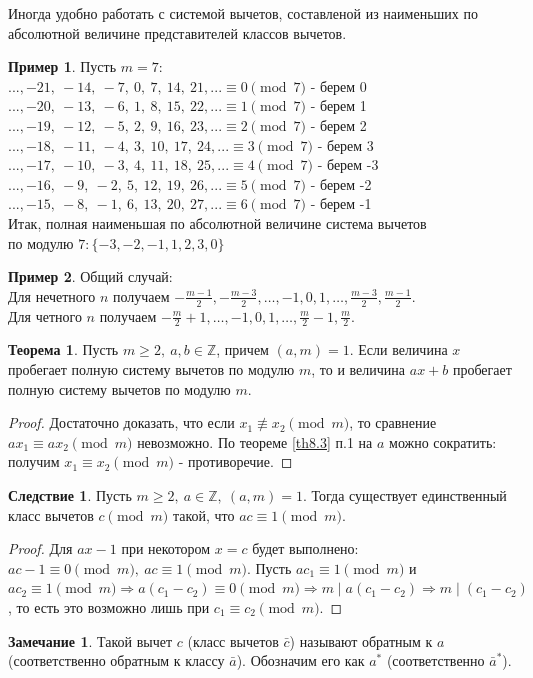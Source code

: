 \documentclass[a4paper, 12pt]{article}
\newcommand{\Z}{\mathbb{Z}}
\renewcommand{\div}{\mid}
\theoremstyle{definition}
\newtheorem{theorem}{Теорема}[section]
\newtheorem*{consequense}{Следствие}
\newtheorem*{comm}{Замечание}
\newtheorem*{example}{Пример}
\begin{document}
    Иногда удобно работать с системой вычетов, составленой из наименьших по абсолютной величине представителей классов вычетов.
    \begin{example}
        Пусть $m=7$:\\
        $...,-21,\ -14,\ -7,\ 0,\ 7,\ 14,\ 21,... \equiv 0 \pmod{7}$ - берем 0\\
        $...,-20,\ -13,\ -6,\ 1,\ 8,\ 15,\ 22,... \equiv 1 \pmod{7}$ - берем 1\\
        $...,-19,\ -12,\ -5,\ 2,\ 9,\ 16,\ 23,... \equiv 2 \pmod{7}$ - берем 2\\
        $...,-18,\ -11,\ -4,\ 3,\ 10,\ 17,\ 24,... \equiv 3 \pmod{7}$ - берем 3\\
        $...,-17,\ -10,\ -3,\ 4,\ 11,\ 18,\ 25,... \equiv 4 \pmod{7}$ - берем -3\\
        $...,-16,\ -9,\ -2,\ 5,\ 12,\ 19,\ 26,... \equiv 5 \pmod{7}$ - берем -2\\
        $...,-15,\ -8,\ -1,\ 6,\ 13,\ 20,\ 27,... \equiv 6 \pmod{7}$ - берем -1\\
        Итак, полная наименьшая по абсолютной величине система вычетов\\ 
        по модулю $7: \{-3,-2,-1,1,2,3,0\}$
    \end{example}
    \begin{example}
        Общий случай:\\
        Для нечетного $n$ получаем $-\frac{m-1}{2},-\frac{m-3}{2},\dots,-1,0,1,\dots,\frac{m-3}{2},\frac{m-1}{2}$.\\
        Для четного $n$ получаем $-\frac{m}{2}+1,\dots,-1,0,1,\dots,\frac{m}{2}-1,\frac{m}{2}$.
    \end{example}
    \begin{theorem}
        Пусть $m\geq 2,\ a,b\in \Z$, причем $(a,m)=1$. Если величина $x$ пробегает полную систему вычетов по модулю $m$, то и величина $ax+b$ пробегает полную систему вычетов по модулю $m$.
    \end{theorem} 
    \begin{proof}
        Достаточно доказать, что если $x_1\not\equiv x_2 \pmod{m}$, то сравнение $ax_1\equiv ax_2 \pmod{m}$ невозможно. По теореме \ref{th8.3} п.1 на $a$ можно сократить: получим $x_1 \equiv x_2 \pmod{m}$ - противоречие.
    \end{proof} 
    \begin{consequense}
        Пусть $m\geq 2,\ a\in \Z,\ (a,m)=1$. Тогда существует единственный класс вычетов $c \pmod{m}$ такой, что $ac\equiv 1 \pmod{m}$.
    \end{consequense} 
    \begin{proof}
        Для $ax-1$ при некотором $x=c$ будет выполнено: $ac-1\equiv 0 \pmod{m},\ ac\equiv 1 \pmod{m}$. Пусть $ac_1 \equiv 1 \pmod{m}$ и $ac_2 \equiv 1 \pmod{m} \Rightarrow a(c_1-c_2)\equiv 0 \pmod{m} \Rightarrow m\div a(c_1-c_2) \Rightarrow m\div (c_1-c_2)$, то есть это возможно лишь при $c_1\equiv c_2 \pmod{m}$.
    \end{proof}
    \begin{comm}
        Такой вычет $c$ (класс вычетов $\bar{c}$) называют обратным к $a$ (соответственно обратным к классу $\bar{a}$). Обозначим его как $a^{\ast}$ (соответственно $\bar{a}^{\ast}$).
    \end{comm} 
\end{document}

